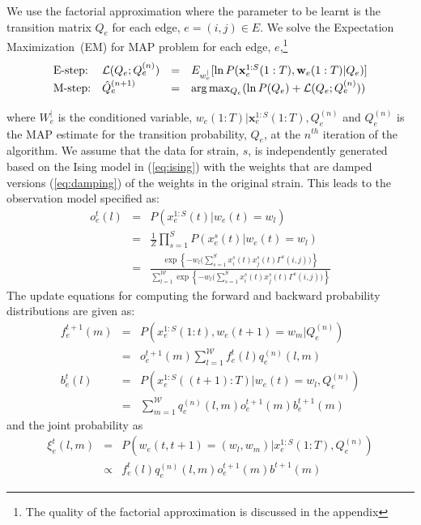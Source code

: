 \documentclass{bioinfo}
\begin{document}
\begin{methods}
We use the factorial approximation where the parameter to be learnt is the transition matrix $Q_{e}$ for
each edge, $e = (i, j) \in E$.  We solve the Expectation
Maximization~(EM)\cite{Dempster77em} for MAP problem for each edge,
$e$,\footnote{The quality of the factorial approximation is discussed in the appendix} 
\begin{equation}
  \label{eq:q-edge_em_map}
  \begin{array}[h]{llll}
  \textrm{E-step:} & {\mathcal L}(Q_{e}; Q_{e}^{(n)}) &=&
  E_{w_{e}^{|} }  [ \ln P(\mathbf{x}_{e}^{1:S}(1:T),
  \mathbf{w}_{e}({1:T}) | Q_{e})] \\
\vspace{2 mm}
  \textrm{M-step:} & \hat{Q}_{e}^{(n+1)} &=& \arg\max_{Q_{e}} (\ln P(Q_{e}) +
  {\mathcal L}(Q_{e}; Q_{e}^{(n)} ) ) 
  \end{array}
\end{equation}
where $W^{|}_{e}$ is the conditioned variable, $w_{e}(1:T)|
\mathbf{x}_{e}^{1:S}(1:T), Q_{e}^{(n)}$ and $Q_{e}^{(n)}$ is the
MAP estimate for the transition probability, $Q_{e}$, at the $n^{th}$
iteration of the algorithm. 
We assume that the data for strain, $s$, is independently generated
based on the Ising model in (\ref{eq:ising}) with the weights that are
damped versions (\ref{eq:damping}) of the weights in the original 
strain. This leads to the observation model specified as:
\begin{eqnarray}
  \label{eq:obs}
  o^{t}_{e}(l) &=& P(x_{e}^{1:S}(t) | w_{e}(t) = w_{l}) \\
\label{eq:obs2}
& = & \frac{1}{Z} \prod_{s=1}^{S} P(x_{e}^{s}(t) | w_{e}(t) = w_{l})
\\
\label{eq:obs3}
& = & \frac{\exp\left\{ - w_{l}\big(\sum_{s=1}^{S}
      x^{s}_{i}(t)x^{s}_{j}(t) \Gamma^{s}(i,j)\big)
  \right\}}{\sum^{\mathcal W}_{l=1}\exp\left\{ - w_{l}\big(\sum_{s=1}^{S}  x^{s}_{i}(t)x^{s}_{j}(t) \Gamma^{s}(i,j)\big) \right\}}
\end{eqnarray}
The update equations for computing the forward and backward
probability distributions are given as:
\begin{eqnarray}
  \label{eq:update}
  f^{t+1}_{e}(m) &=& P(x_{e}^{1:S}(1:t) , w_{e}(t+1) = w_{m} | Q^{(n)}_{e}) \\
&=& o^{t+1}_{e}(m) \sum_{l=1}^{{\mathcal W}} f_{e}^{t}(l) q_{e}^{(n)}(l, m) \\
  b^{t}_{e}(l) &=& P(x^{1:S}_{e}((t+1):T) | w_{e}(t) = w_{l},
  Q^{(n)}_{e})  \\
\label{eq:update-1}
&=& \sum_{m=1}^{{\mathcal W}} q_{e}^{(n)}(l, m) o^{t+1}_{e}(m) b^{t+1}_{e}(m)
\end{eqnarray}
and the joint probability as
\begin{eqnarray}
  \label{eq:p-joint}
  \xi_{e}^{t}(l,m) &=& P(w_{e}(t,t+1) =(w_{l}, w_{m}) |
  x^{1:S}_{e}(1:T), Q^{(n)}_{e}) \\
&\propto& f_{e}^{t}(l) q_{e}^{(n)}(l, m) o_{e}^{t+1}(m) b^{t+1}(m) 
\end{eqnarray}


\end{methods}
\end{document}
